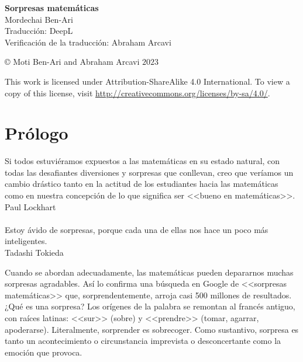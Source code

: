 
\thispagestyle{empty}
\begin{center}
\textbf{\LARGE Sorpresas matemáticas}\\
\bigskip\bigskip\bigskip
\textsf{\large Mordechai Ben-Ari}\\
\bigskip\bigskip
\textsf{\large Traducción: DeepL}\\
\bigskip\bigskip
\textsf{\large Verificación de la traducción: Abraham Arcavi}
\end{center}

\vfill

\begin{center}
\copyright{} Moti Ben-Ari and Abraham Arcavi $2023$
\end{center}
 
\begin{small}
\noindent{}This work is licensed under Attribution-ShareAlike 4.0 International. To view a copy of this license, visit \url{http://creativecommons.org/licenses/by-sa/4.0/}.
\end{small}
%

\chapter*{Prólogo}

\begin{flushright}
\parbox{7cm}{
\begin{footnotesize}
\begin{flushright}
Si todos estuviéramos expuestos a las matemáticas en su estado natural, con todas las desafiantes diversiones y sorpresas que conllevan, creo que veríamos un cambio drástico tanto en la actitud de los estudiantes hacia las matemáticas como en nuestra concepción de lo que significa ser <<bueno en matemáticas>>.\\
Paul Lockhart\mbox{}\\\mbox{}\\
Estoy ávido de sorpresas, porque cada una de ellas nos hace un poco más inteligentes.\\
Tadashi Tokieda
\end{flushright}
\end{footnotesize}
}
\end{flushright}

\medskip

Cuando se abordan adecuadamente, las matemáticas pueden depararnos muchas sorpresas agradables. Así lo confirma una búsqueda en Google de <<sorpresas matemáticas>> que, sorprendentemente, arroja casi 500 millones de resultados. ¿Qué es una sorpresa? Los orígenes de la palabra se remontan al francés antiguo, con raíces latinas: <<sur>> (sobre) y <<prendre>> (tomar, agarrar, apoderarse). Literalmente, sorprender es sobrecoger. Como sustantivo, sorpresa es tanto un acontecimiento o circunstancia imprevista o desconcertante como la emoción que provoca.

